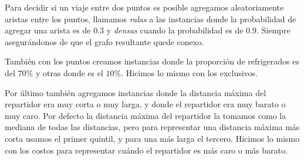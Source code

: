 \documentclass[10pt]{article}
\begin{document}
	Para decidir si un viaje entre dos puntos es posible agregamos aleatoriamente aristas entre los puntos, llamamos \textit{ralas} a las instancias donde la probabilidad de agregar una arista es de $0.3$ y \textit{densas} cuando la probabilidad es de $0.9$. Siempre asegurándonos de que el grafo resultante quede conexo.

	También con los puntos creamos instancias donde la proporción de refrigerados es del $70\%$ y otras donde es el $10\%$. Hicimos lo mismo con los exclusivos.

	Por último también agregamos instancias donde la distancia máxima del repartidor era muy corta o muy larga, y donde el repartidor era muy barato o muy caro. Por defecto la distancia máxima del repartidor la tomamos como la mediana de todas las distancias, pero para representar una distancia máxima más corta usamos el primer quintil, y para una más larga el tercero. Hicimos lo mismo con los costos para representar cuándo el repartidor es más caro o más barato.
\end{document}
